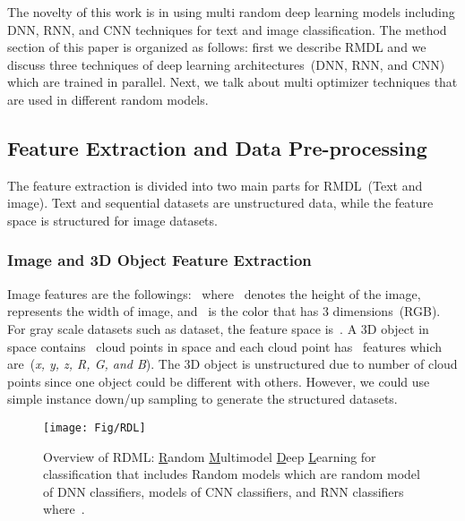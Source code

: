 \documentclass[sigconf, final]{acmart}
\begin{document}
The novelty of this work is in using multi random deep learning models including DNN, RNN, and CNN techniques for text and image classification. The method section of this paper is organized as follows: first we describe RMDL and we discuss three techniques of deep learning architectures~(DNN, RNN, and CNN) which are trained in parallel. Next, we talk about multi optimizer techniques that are used in different random models. 
\subsection{Feature Extraction and Data Pre-processing}\label{subsect:Feature}
The feature extraction is divided into two main parts for RMDL~(Text and image). Text and sequential datasets are unstructured data, while the feature space is structured for image datasets.
\subsubsection{Image and 3D Object Feature Extraction}
Image features are the followings:~ where~ denotes the height of the image,~ represents the width of image, and~ is the color that has 3 dimensions~(RGB). For gray scale datasets such as  dataset, the feature space is~. A 3D object in space contains~ cloud points in space and each cloud point has~ features which are~(\textit{x, y, z, R, G, and B}). The 3D object is unstructured due to number of cloud points since one object could be different with others. However, we could use simple instance down/up sampling to generate the structured datasets.
\begin{figure*}[t]
\centering
\texttt{[image: Fig/RDL]}

\caption{Overview of RDML: \underline{R}andom \underline{M}ultimodel \underline{D}eep \underline{L}earning for classification that includes  Random models which are  random model of DNN classifiers,  models of CNN classifiers, and  RNN classifiers where~.}\label{Fig_RMDL}
\vspace{-0.15in}

\end{figure*}
\end{document}

